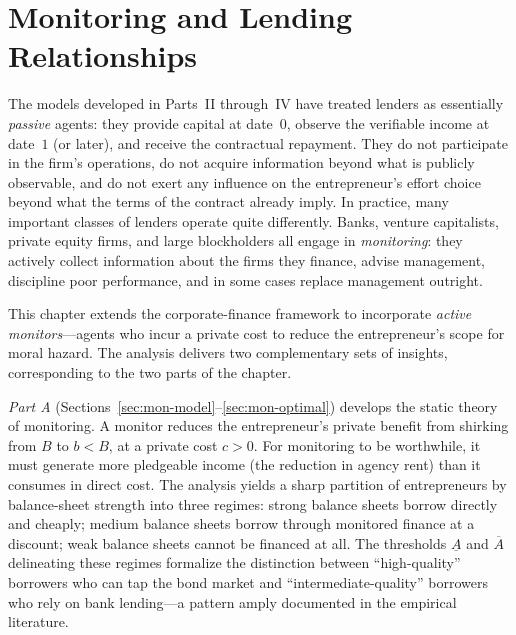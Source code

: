 \documentclass[11pt,a4paper,oneside]{book}
\theoremstyle{plain}
\theoremstyle{definition}
\theoremstyle{remark}
\numberwithin{equation}{chapter}
\begin{document}
\chapter{Monitoring and Lending Relationships}
\label{ch:monitoring}

The models developed in Parts~II through~IV have treated lenders as essentially \emph{passive} agents: they provide capital at date~$0$, observe the verifiable income at date~$1$ (or later), and receive the contractual repayment.
They do not participate in the firm's operations, do not acquire information beyond what is publicly observable, and do not exert any influence on the entrepreneur's effort choice beyond what the terms of the contract already imply.
In practice, many important classes of lenders operate quite differently.
Banks, venture capitalists, private equity firms, and large blockholders all engage in \emph{monitoring}: they actively collect information about the firms they finance, advise management, discipline poor performance, and in some cases replace management outright.

This chapter extends the corporate-finance framework to incorporate \emph{active monitors}---agents who incur a private cost to reduce the entrepreneur's scope for moral hazard.
The analysis delivers two complementary sets of insights, corresponding to the two parts of the chapter.

\emph{Part A} (Sections~\ref{sec:mon-model}--\ref{sec:mon-optimal}) develops the static theory of monitoring.
A monitor reduces the entrepreneur's private benefit from shirking from $B$ to $b < B$, at a private cost $c > 0$.
For monitoring to be worthwhile, it must generate more pledgeable income (the reduction in agency rent) than it consumes in direct cost.
The analysis yields a sharp partition of entrepreneurs by balance-sheet strength into three regimes: strong balance sheets borrow directly and cheaply; medium balance sheets borrow through monitored finance at a discount; weak balance sheets cannot be financed at all.
The thresholds $\underline{A}$ and $\overline{A}$ delineating these regimes formalize the distinction between ``high-quality'' borrowers who can tap the bond market and ``intermediate-quality'' borrowers who rely on bank lending---a pattern amply documented in the empirical literature.
\end{document}
